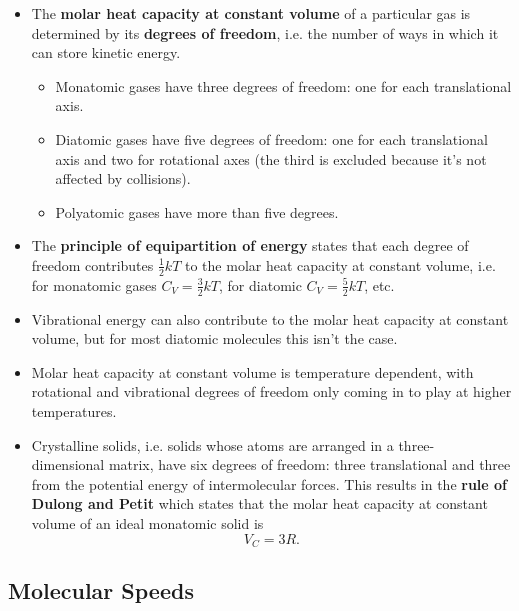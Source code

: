 \documentclass{article}
\begin{document}
\begin{itemize}
  \item The \textbf{molar heat capacity at constant volume} of a particular gas is determined by its \textbf{degrees of freedom}, i.e. the number of ways in which it can store kinetic energy.

        \begin{itemize}
          \item Monatomic gases have three degrees of freedom: one for each translational axis.

          \item Diatomic gases have five degrees of freedom: one for each translational axis and two for rotational axes (the third is excluded because it's not affected by collisions).

          \item Polyatomic gases have more than five degrees.
        \end{itemize}

  \item The \textbf{principle of equipartition of energy} states that each degree of freedom contributes $\frac{1}{2} k T$ to the molar heat capacity at constant volume, i.e. for monatomic gases $C_V = \frac{3}{2} k T$, for diatomic $C_V = \frac{5}{2} k T$, etc.

  \item Vibrational energy can also contribute to the molar heat capacity at constant volume, but for most diatomic molecules this isn't the case.

  \item Molar heat capacity at constant volume is temperature dependent, with rotational and vibrational degrees of freedom only coming in to play at higher temperatures.

  \item Crystalline solids, i.e. solids whose atoms are arranged in a three-\\dimensional matrix, have six degrees of freedom: three translational and three from the potential energy of intermolecular forces. This results in the \textbf{rule of Dulong and Petit} which states that the molar heat capacity at constant volume of an ideal monatomic solid is \[V_C = 3 R.\]
\end{itemize}

\subsection{Molecular Speeds}
\end{document}
